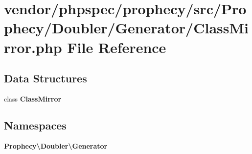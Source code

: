 \section{vendor/phpspec/prophecy/src/\+Prophecy/\+Doubler/\+Generator/\+Class\+Mirror.php File Reference}
\label{_class_mirror_8php}
\subsection*{Data Structures}
\begin{DoxyCompactItemize}
\item 
class {\bf Class\+Mirror}
\end{DoxyCompactItemize}
\subsection*{Namespaces}
\begin{DoxyCompactItemize}
\item 
 {\bf Prophecy\textbackslash{}\+Doubler\textbackslash{}\+Generator}
\end{DoxyCompactItemize}
